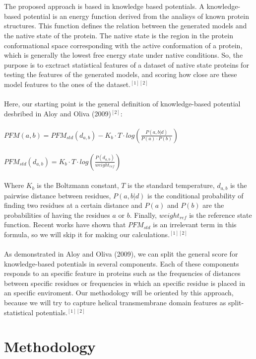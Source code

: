 \documentclass[12pt,titlepage]{article}
\theoremstyle{supercalifragilisticexpialidocious}
\begin{document}
\\ \\
The proposed approach is based in knowledge based potentials. A knowledge-based potential is an energy function derived from the analisys of known protein structures. This function defines the relation between the generated models and the native state of the protein. The native state is the region in the protein conformational space corresponding with the active conformation of a protein, which is generally the lowest free energy state under native conditions. So, the purpose is to exctract statistical features of a dataset of native state proteins for testing the features of the generated models, and scoring how close are these model features to the ones of the dataset.$^{[1][2]}$
\\ \\
Here, our starting point is the general definition of knowledge-based potential desbribed in Aloy and Oliva (2009)$^{[2]}$:
\\ \\
$PFM(a, b) = PFM_{std}(d_{a,b}) - K_b \cdot T \cdot log(\frac{P(a,b|d)}{P(a) \cdot P(b)})$
\\ \\
$
PFM_{std}(d_{a,b}) = K_b \cdot T \cdot log(\frac{P(d_{a,b})}{weight_{ref}})
$
\\ \\
Where $K_b$ is the Boltzmann constant, $T$ is the standard temperature, $d_{a,b}$ is the pairwise distance between residues, $P(a,b|d)$ is the conditional probability of finding two residues at a certain distance and $P(a)$ and $P(b)$ are the probabilities of having the residues $a$ or $b$. Finally, $weight_{ref}$ is the reference state function. Recent works have shown that $PFM_{std}$ is an irrelevant term in this formula, so we will skip it for making our calculations.$^{[1][2]}$
\\ \\
As demonstrated in Aloy and Oliva (2009), we can split the general score for knowledge-based potentials in several components. Each of these components responds to an specific feature in proteins such as the frequencies of distances between specific residues or frequencies in which an specific residue is placed in an specific enviroment. Our methodology will be oriented by this approach, because we will try to capture helical transmembrane domain features as split-statistical potentials.$^{[1][2]}$




\section{Methodology }
\end{document}
